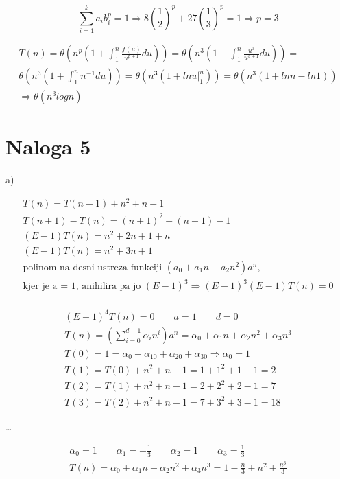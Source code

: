 \documentclass[12pt]{article}
\begin{document}
  \begin{equation}
    \sum_{i=1}^{k}{a_ib_i^p} = 1 \Rightarrow 8(\frac{1}{2})^p + 27(\frac{1}{3})^p = 1 \Rightarrow p = 3
  \end{equation}

  \begin{equation}
    \begin{aligned}
      T(n) = \theta(n^p(1 + \int_{1}^{n}{\frac{f(u)}{u^{p+1}}du})) = \theta(n^3(1 + \int_{1}^{n}{\frac{u^3}{u^{3+1}}du})) =\\
      \theta(n^3(1 + \int_{1}^{n}{n^{-1}du})) = \theta(n^3(1 + lnu\rvert_{1}^{n})) = \theta(n^3(1 + lnn - ln1))\\
      \Rightarrow \theta(n^3logn)
    \end{aligned}
  \end{equation}

  \section*{Naloga 5}
  a)

  \begin{equation}
    \begin{aligned}
      T(n) = T(n-1) + n^2 + n - 1\\
      T(n+1) - T(n)= (n+1)^2 + (n + 1) - 1\\
      (E-1)T(n)=n^2+2n+1+n\\
      (E-1)T(n)=n^2+3n+1\\
      \text{polinom na desni ustreza funkciji } (a_0 + a_1n + a_2n^2)a^n,\\
      \text{kjer je a = 1, anihilira pa jo }(E-1)^3 \Rightarrow (E-1)^3(E-1)T(n)=0\\
    \end{aligned}
  \end{equation}

  \begin{equation}
    \begin{aligned}
      (E-1)^4T(n)=0\qquad a = 1\qquad d = 0\\
      T(n) = (\sum_{i=0}^{d-1}{\alpha_in^i})a^n = \alpha_0 + \alpha_1n + \alpha_2n^2 + \alpha_3n^3\\
      T(0) = 1 = \alpha_0 + \alpha_10 + \alpha_20 + \alpha_30 \Rightarrow \alpha_0 = 1\\
      T(1) = T(0) + n^2 + n - 1 = 1 + 1^2 + 1 - 1 = 2\\
      T(2) = T(1) + n^2 + n - 1 = 2 + 2^2 + 2 - 1 = 7\\
      T(3) = T(2) + n^2 + n - 1 = 7 + 3^2 + 3 - 1 = 18
    \end{aligned}
  \end{equation}

  \dots

  \begin{equation}
    \begin{aligned}
      \alpha_0 = 1\qquad \alpha_1 = -\frac{1}{3}\qquad \alpha_2 = 1\qquad \alpha_3 = \frac{1}{3}\\
      T(n) = \alpha_0 + \alpha_1n + \alpha_2n^2 + \alpha_3n^3 = 1 -\frac{n}{3} + n^2 + \frac{n^3}{3}\\
    \end{aligned}
  \end{equation}
\end{document}
